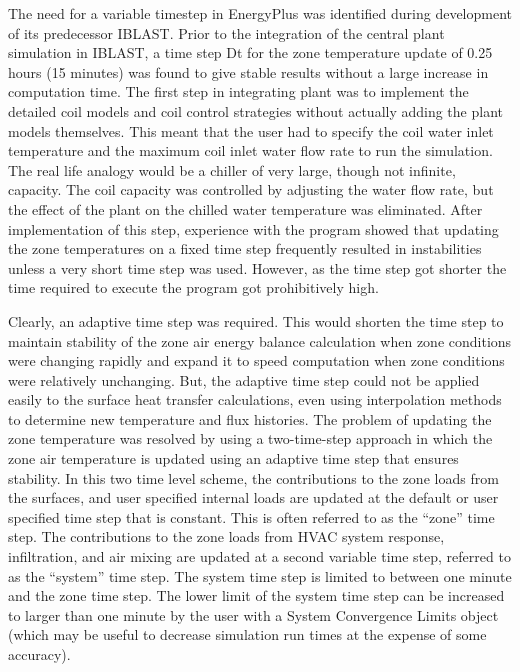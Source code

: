 The need for a variable timestep in EnergyPlus was identified during development of its predecessor IBLAST. Prior to the integration of the central plant simulation in IBLAST, a time step Dt for the zone temperature update of 0.25 hours (15 minutes) was found to give stable results without a large increase in computation time. The first step in integrating plant was to implement the detailed coil models and coil control strategies without actually adding the plant models themselves. This meant that the user had to specify the coil water inlet temperature and the maximum coil inlet water flow rate to run the simulation. The real life analogy would be a chiller of very large, though not infinite, capacity. The coil capacity was controlled by adjusting the water flow rate, but the effect of the plant on the chilled water temperature was eliminated. After implementation of this step, experience with the program showed that updating the zone temperatures on a fixed time step frequently resulted in instabilities unless a very short time step was used. However, as the time step got shorter the time required to execute the program got prohibitively high.

Clearly, an adaptive time step was required. This would shorten the time step to maintain stability of the zone air energy balance calculation when zone conditions were changing rapidly and expand it to speed computation when zone conditions were relatively unchanging. But, the adaptive time step could not be applied easily to the surface heat transfer calculations, even using interpolation methods to determine new temperature and flux histories. The problem of updating the zone temperature was resolved by using a two-time-step approach in which the zone air temperature is updated using an adaptive time step that ensures stability. In this two time level scheme, the contributions to the zone loads from the surfaces, and user specified internal loads are updated at the default or user specified time step that is constant. This is often referred to as the ``zone'' time step. The contributions to the zone loads from HVAC system response, infiltration, and air mixing are updated at a second variable time step, referred to as the ``system'' time step. The system time step is limited to between one minute and the zone time step. The lower limit of the system time step can be increased to larger than one minute by the user with a System Convergence Limits object (which may be useful to decrease simulation run times at the expense of some accuracy).

